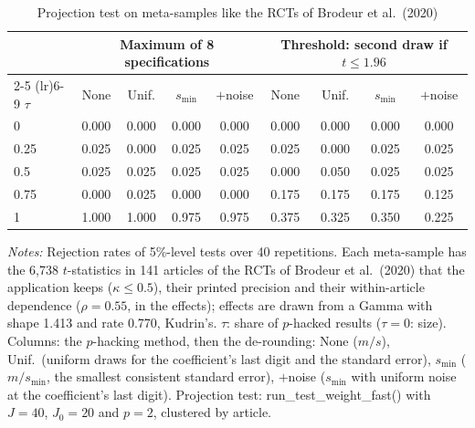 \begin{table}[htbp]
\centering
\caption{Projection test on meta-samples like the RCTs of Brodeur et al.\ (2020)}
\label{tab:brodeur_rct_power_proj}
\footnotesize
\setlength{\tabcolsep}{4pt}
\begin{tabular}{lcccccccc}
\toprule
 & \multicolumn{4}{c}{Maximum of 8 specifications} & \multicolumn{4}{c}{Threshold: second draw if $t \le 1.96$} \\
\cmidrule(lr){2-5} \cmidrule(lr){6-9}
$\tau$ & None & Unif. & $s_{\min}$ & $+$noise & None & Unif. & $s_{\min}$ & $+$noise \\
\midrule
0 & 0.000 & 0.000 & 0.000 & 0.000 & 0.000 & 0.000 & 0.000 & 0.000 \\
0.25 & 0.025 & 0.000 & 0.025 & 0.025 & 0.025 & 0.000 & 0.025 & 0.025 \\
0.5 & 0.025 & 0.025 & 0.025 & 0.025 & 0.000 & 0.050 & 0.025 & 0.025 \\
0.75 & 0.000 & 0.025 & 0.000 & 0.000 & 0.175 & 0.175 & 0.175 & 0.125 \\
1 & 1.000 & 1.000 & 0.975 & 0.975 & 0.375 & 0.325 & 0.350 & 0.225 \\
\bottomrule
\end{tabular}
\par\smallskip
\begin{minipage}{\linewidth}\footnotesize\textit{Notes:} Rejection rates of 5\%-level tests over 40 repetitions. Each meta-sample has the 6{,}738 $t$-statistics in 141 articles of the RCTs of Brodeur et al.\ (2020) that the application keeps ($\kappa \le 0.5$), their printed precision and their within-article dependence ($\rho = 0.55$, in the effects); effects are drawn from a Gamma with shape 1.413 and rate 0.770, Kudrin's. $\tau$: share of $p$-hacked results ($\tau = 0$: size). Columns: the $p$-hacking method, then the de-rounding: None ($m/s$), Unif.\ (uniform draws for the coefficient's last digit and the standard error), $s_{\min}$ ($m/s_{\min}$, the smallest consistent standard error), $+$noise ($s_{\min}$ with uniform noise at the coefficient's last digit). Projection test: run\_test\_weight\_fast() with $J = 40$, $J_0 = 20$ and $p = 2$, clustered by article.\end{minipage}
\end{table}
